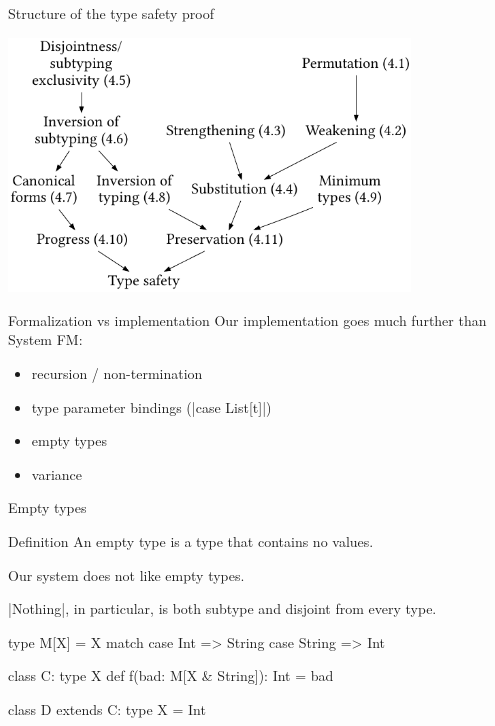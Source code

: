 \documentclass[10pt]{beamer}
\newenvironment{slide}[2][]
  {\begin{frame}[fragile,environment=slide,#1]{#2}}
  {\end{frame}}
\begin{document}
\begin{slide}{Structure of the type safety proof}
\begin{center}
\includegraphics[width=0.8\textwidth]{figures/FMProofStructure.pdf}
\end{center}
\end{slide}

\begin{slide}{Formalization vs implementation}
Our implementation goes much further than System FM:
\begin{itemize}
  \item recursion / non-termination
  \item type parameter bindings (|case List[t]|)
  \item empty types
  \item variance
\end{itemize}
\end{slide}

\begin{slide}{Empty types}

\begin{block}{Definition}
An empty type is a type that contains no values.
\end{block}

\pause

Our system does not like empty types.

|Nothing|, in particular, is both subtype and disjoint from every type.

\pause

\begin{code}
type M[X] = X match
  case Int => String
  case String => Int

class C:
  type X
  def f(bad: M[X & String]): Int = bad

class D extends C:
  type X = Int
\end{code}
\end{slide}
\end{document}
